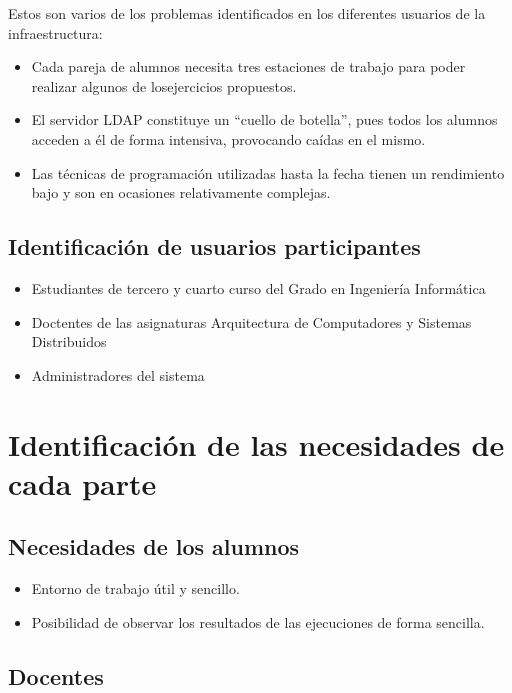 \documentclass{article}
\begin{document}
Estos son varios de los problemas identificados en los diferentes usuarios de la infraestructura:

\begin{itemize}
  \item Cada pareja de alumnos necesita tres estaciones de trabajo para poder realizar algunos de losejercicios propuestos.
  \item El servidor LDAP constituye un ``cuello de botella'', pues todos los alumnos acceden a él de forma intensiva, provocando caídas en el mismo.
  \item Las técnicas de programación utilizadas hasta la fecha tienen un rendimiento bajo y son en ocasiones relativamente complejas.
\end{itemize}

\subsection{Identificación de usuarios participantes}

\begin{itemize}

  \item Estudiantes de tercero y cuarto curso del Grado en Ingeniería Informática
  \item Doctentes de las asignaturas Arquitectura de Computadores y Sistemas Distribuidos
  \item Administradores del sistema
\end{itemize}

\section{Identificación de las necesidades de cada parte}
\subsection{Necesidades de los alumnos}

\begin{itemize}
  \item Entorno de trabajo útil y sencillo.
  \item Posibilidad de observar los resultados de las ejecuciones de forma sencilla.
\end{itemize}

\subsection{Docentes}
\end{document}
